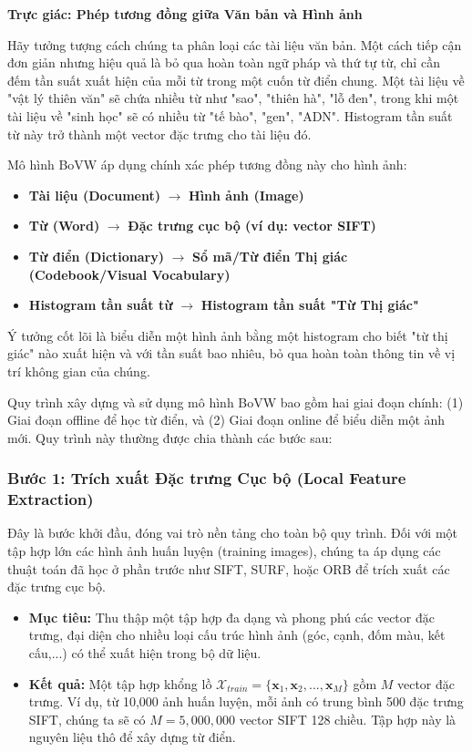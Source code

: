 \begin{mdframed}[style=infobox]
    \textbf{Trực giác: Phép tương đồng giữa Văn bản và Hình ảnh}
    
    Hãy tưởng tượng cách chúng ta phân loại các tài liệu văn bản. Một cách tiếp cận đơn giản nhưng hiệu quả là bỏ qua hoàn toàn ngữ pháp và thứ tự từ, chỉ cần đếm tần suất xuất hiện của mỗi từ trong một cuốn từ điển chung. Một tài liệu về "vật lý thiên văn" sẽ chứa nhiều từ như "sao", "thiên hà", "lỗ đen", trong khi một tài liệu về "sinh học" sẽ có nhiều từ "tế bào", "gen", "ADN". Histogram tần suất từ này trở thành một vector đặc trưng cho tài liệu đó.
    
    Mô hình BoVW áp dụng chính xác phép tương đồng này cho hình ảnh:
    \begin{itemize}
        \item \textbf{Tài liệu (Document)} $\rightarrow$ \textbf{Hình ảnh (Image)}
        \item \textbf{Từ (Word)} $\rightarrow$ \textbf{Đặc trưng cục bộ (ví dụ: vector SIFT)}
        \item \textbf{Từ điển (Dictionary)} $\rightarrow$ \textbf{Sổ mã/Từ điển Thị giác (Codebook/Visual Vocabulary)}
        \item \textbf{Histogram tần suất từ} $\rightarrow$ \textbf{Histogram tần suất "Từ Thị giác"}
    \end{itemize}
    Ý tưởng cốt lõi là biểu diễn một hình ảnh bằng một histogram cho biết "từ thị giác" nào xuất hiện và với tần suất bao nhiêu, bỏ qua hoàn toàn thông tin về vị trí không gian của chúng.
\end{mdframed}

Quy trình xây dựng và sử dụng mô hình BoVW bao gồm hai giai đoạn chính: (1) Giai đoạn offline để học từ điển, và (2) Giai đoạn online để biểu diễn một ảnh mới. Quy trình này thường được chia thành các bước sau:

\subsubsection{Bước 1: Trích xuất Đặc trưng Cục bộ (Local Feature Extraction)}
\label{subsubsec:bovw_extraction}
Đây là bước khởi đầu, đóng vai trò nền tảng cho toàn bộ quy trình. Đối với một tập hợp lớn các hình ảnh huấn luyện (training images), chúng ta áp dụng các thuật toán đã học ở phần trước như SIFT, SURF, hoặc ORB để trích xuất các đặc trưng cục bộ.
\begin{itemize}
    \item \textbf{Mục tiêu:} Thu thập một tập hợp đa dạng và phong phú các vector đặc trưng, đại diện cho nhiều loại cấu trúc hình ảnh (góc, cạnh, đốm màu, kết cấu,...) có thể xuất hiện trong bộ dữ liệu.
    \item \textbf{Kết quả:} Một tập hợp khổng lồ $\mathcal{X}_{train} = \{\mathbf{x}_1, \mathbf{x}_2, ..., \mathbf{x}_M\}$ gồm $M$ vector đặc trưng. Ví dụ, từ 10,000 ảnh huấn luyện, mỗi ảnh có trung bình 500 đặc trưng SIFT, chúng ta sẽ có $M = 5,000,000$ vector SIFT 128 chiều. Tập hợp này là nguyên liệu thô để xây dựng từ điển.
\end{itemize}


